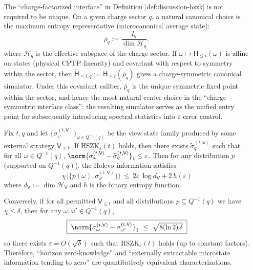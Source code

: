 \begin{remark}\label{rem:discussion-canonical-simulator-microcanonical}
The ``charge-factorized interface'' in Definition \ref{def:discussion-hszk} is not required to be unique.
On a given charge sector \(q\), a natural canonical choice is the maximum entropy representative (microcanonical average state):
\[
\bar\rho_q:=\frac{I_q}{\dim\mathcal{H}_q},
\]
where \(\mathcal{H}_q\) is the effective subspace of the charge sector.
If \(\omega\mapsto \mathsf{H}_{\le t}(\omega)\) is affine on states (physical CPTP linearity) and covariant with respect to symmetry within the sector, then
\(\widetilde{\mathsf{H}}_{\le t,q}:=\mathsf{H}_{\le t}(\bar\rho_q)\)
gives a charge-symmetric canonical simulator.
Under this covariant caliber, \(\bar\rho_q\) is the unique symmetric fixed point within the sector, and hence the most natural center choice in the ``charge-symmetric interface class''; the resulting simulator serves as the unified entry point for subsequently introducing spectral statistics into \(\varepsilon\) error control.
\end{remark}

\begin{proposition}\label{prop:discussion-hszk-holevo}
Fix \(t,q\) and let \(\{\sigma^{(t,\mathsf{V})}_\omega\}_{\omega\in Q^{-1}(q)}\) be the view state family produced by some external strategy \(\mathsf{V}_{\le t}\).
If \(\mathrm{HSZK}_\varepsilon(t)\) holds, then there exists \(\widetilde{\sigma}^{(t,\mathsf{V})}_q\) such that for all \(\omega\in Q^{-1}(q)\), \(\norm{\sigma^{(t,\mathsf{V})}_\omega-\widetilde{\sigma}^{(t,\mathsf{V})}_q}_1\le \varepsilon\).
Then for any distribution \(p\) (supported on \(Q^{-1}(q)\)), the Holevo information satisfies
\begin{equation}\label{eq:discussion-holevo-upper}
\boxed{\;
\chi\bigl(\{p(\omega),\sigma^{(t,\mathsf{V})}_\omega\}\bigr)
\ \le\
2\varepsilon\,\log d_{\mathsf{V}}+2\,h(\varepsilon)\;}
\end{equation}
where \(d_{\mathsf{V}}:=\dim\mathcal{H}_{\mathsf{V}}\) and \(h\) is the binary entropy function.
\par
Conversely, if for all permitted \(\mathsf{V}_{\le t}\) and all distributions \(p\subseteq Q^{-1}(q)\) we have \(\chi\le \delta\),
then for any \(\omega,\omega'\in Q^{-1}(q)\),
\begin{equation}\label{eq:discussion-holevo-reverse}
\boxed{\;
\norm{\sigma^{(t,\mathsf{V})}_\omega-\sigma^{(t,\mathsf{V})}_{\omega'}}_1
\ \le\
\sqrt{8(\ln 2)\,\delta}\;}
\end{equation}
so there exists \(\varepsilon=O(\sqrt{\delta})\) such that \(\mathrm{HSZK}_\varepsilon(t)\) holds (up to constant factors).
Therefore, ``horizon zero-knowledge'' and ``externally extractable microstate information tending to zero'' are quantitatively equivalent characterizations.
\end{proposition}

